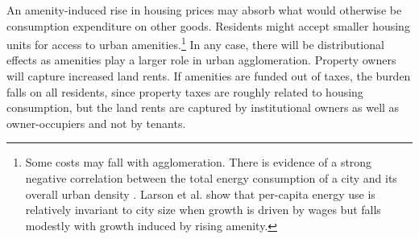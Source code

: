 
 


An amenity-induced rise in housing prices may absorb what would otherwise be consumption expenditure on other goods. Residents might accept smaller housing units for access to urban amenities.\footnote{Some costs may fall with agglomeration. There is evidence of a strong negative correlation between the total energy consumption of a city and its overall urban density \cite{newmanSustainabilityCitiesOvercoming1999}. Larson et al. \cite{larsonEnergyImplicationsCity2015} show that per-capita energy use is relatively invariant to city size when growth is driven by wages but falls modestly with growth induced by rising amenity.} In any case, there will be distributional effects as amenities play a larger role in urban agglomeration. Property owners will capture increased land rents. If amenities are funded out of taxes, the burden falls on all residents, since property taxes are roughly related to housing consumption, but the land rents are captured by institutional owners as well as owner-occupiers and not by tenants.


